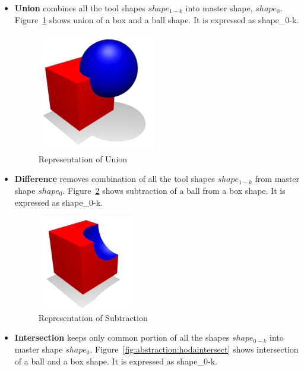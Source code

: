 \begin{itemize}[noitemsep,topsep=2pt,parsep=2pt,partopsep=2pt]
\item {\bf Union} combines all the tool shapes ${shape_{1-k}}$ into master shape, $shape_0$.  Figure~\ref{fig:abstraction:hodaunion} shows union of a box and a ball shape. It is expressed as  {shape_{0-k}}.

\begin{figure}[!h]
\centering 
\includegraphics[width=0.35\linewidth]{images/wikiunite} 
\caption{Representation of Union}
\label{fig:abstraction:hodaunion}
\end{figure}


\item {\bf Difference} removes combination of all the tool shapes ${shape_{1-k}}$ from master shape $shape_0$. Figure~\ref{fig:abstraction:hodasubtract} shows subtraction of a ball from a box shape. It is expressed as  {shape_{0-k}}.


\begin{figure}[!h]
\centering 
\includegraphics[width=0.3\linewidth]{images/wikisubtract} 
\caption{Representation of Subtraction}
\label{fig:abstraction:hodasubtract}
\end{figure}






\item {\bf Intersection} keeps only common portion of all the shapes ${shape_{0-k}}$ into master shape $shape_0$. Figure~\ref{fig:abstraction:hodaintersect} shows intersection of a ball and a box shape. It is expressed as  {shape_{0-k}}.	


\end{itemize}

